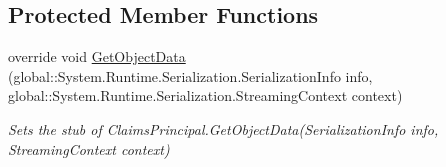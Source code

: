 \subsection*{Protected Member Functions}
\begin{DoxyCompactItemize}
\item 
override void \hyperlink{class_system_1_1_security_1_1_principal_1_1_fakes_1_1_stub_windows_principal_a35b13a427341cfaf4611a15c6a958fd3}{Get\-Object\-Data} (global\-::\-System.\-Runtime.\-Serialization.\-Serialization\-Info info, global\-::\-System.\-Runtime.\-Serialization.\-Streaming\-Context context)
\begin{DoxyCompactList}\small\item\em Sets the stub of Claims\-Principal.\-Get\-Object\-Data(\-Serialization\-Info info, Streaming\-Context context)\end{DoxyCompactList}\end{DoxyCompactItemize}
